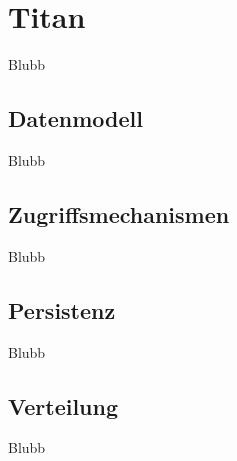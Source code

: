 \section{Titan}

Blubb

\subsection{Datenmodell}

Blubb

\subsection{Zugriffsmechanismen}

Blubb

\subsection{Persistenz}

Blubb

\subsection{Verteilung}

Blubb